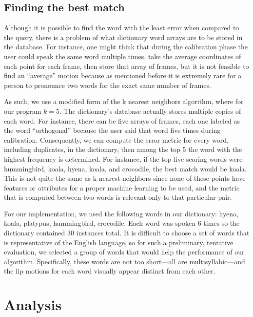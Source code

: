 \documentclass[10pt,twocolumn,letterpaper]{article}
\begin{document}
\subsection{Finding the best match}

Although it is possible to find the word with the least error when compared to the query, there is a problem of what dictionary word arrays are to be stored in the database. For instance, one might think that during the calibration phase the user could speak the same word multiple times, take the average coordinates of each point for each frame, then store that array of frames, but it is not feasible to find an “average” motion because as mentioned before it is extremely rare for a person to pronounce two words for the exact same number of frames.

As such, we use a modified form of the k nearest neighbors algorithm, where for our program $k=5$. The dictionary’s database actually stores multiple copies of each word. For instance, there can be five arrays of frames, each one labeled as the word “orthogonal” because the user said that word five times during calibration. Consequently, we can compute the error metric for every word, including duplicates, in the dictionary, then among the top 5 the word with the highest frequency is determined. For instance, if the top five scoring words were hummingbird, koala, hyena, koala, and crocodile, the best match would be koala. This is not quite the same as k nearest neighbors since none of these points have features or attributes for a proper machine learning to be used, and the metric that is computed between two words is relevant only to that particular pair.

For our implementation, we used the following words in our dictionary: hyena, koala, platypus, hummingbird, crocodile. Each word was spoken 6 times so the dictionary contained 30 instances total. It is difficult to choose a set of words that is representative of the English language, so for such a preliminary, tentative evaluation, we selected a group of words that would help the performance of our algorithm. Specifically, these words are not too short—all are multisyllabic—and the lip motions for each word visually appear distinct from each other.


\section{Analysis}
\end{document}
